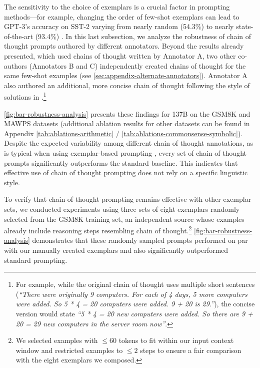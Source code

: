 The sensitivity to the choice of exemplars is a crucial factor in prompting methods—for example, changing the order of few-shot exemplars can lead to GPT-3’s accuracy on SST-2 varying from nearly random (54.3\%) to nearly state-of-the-art (93.4\%) \citep{zhao2021calibrate}. In this last subsection, we analyze the robustness of chain of thought prompts authored by different annotators. Beyond the results already presented, which used chains of thought written by Annotator A, two other co-authors (Annotators B and C) independently created chains of thought for the same few-shot examples (see \cref{sec:appendix-alternate-annotators}). Annotator A also authored an additional, more concise chain of thought following the style of solutions in \citet{cobbe2021training}.\footnote{For example, while the original chain of thought uses multiple short sentences (\textit{``There were originally 9 computers. For each of 4 days, 5 more computers were added. So 5 * 4 = 20 computers were added. 9 + 20 is 29.''}), the concise version would state \textit{``5 * 4 = 20 new computers were added. So there are 9 + 20 = 29 new computers in the server room now''}.}

\cref{fig:bar-robustness-analysis} presents these findings for \lamda{} 137B on the GSM8K and MAWPS datasets (additional ablation results for other datasets can be found in Appendix \cref{tab:ablations-arithmetic} / \cref{tab:ablations-commonsense-symbolic}). Despite the expected variability among different chain of thought annotations, as is typical when using exemplar-based prompting \citep{le-scao-rush-2021-many,reynolds2021prompt,zhao2021calibrate}, every set of chain of thought prompts significantly outperforms the standard baseline. This indicates that effective use of chain of thought prompting does not rely on a specific linguistic style.

To verify that chain-of-thought prompting remains effective with other exemplar sets, we conducted experiments using three sets of eight exemplars randomly selected from the GSM8K training set, an independent source whose examples already include reasoning steps resembling chain of thought.\footnote{We selected examples with $\leq 60$ tokens to fit within our input context window and restricted examples to $\leq 2$ steps to ensure a fair comparison with the eight exemplars we composed.} \cref{fig:bar-robustness-analysis} demonstrates that these randomly sampled prompts performed on par with our manually created exemplars and also significantly outperformed standard prompting.

